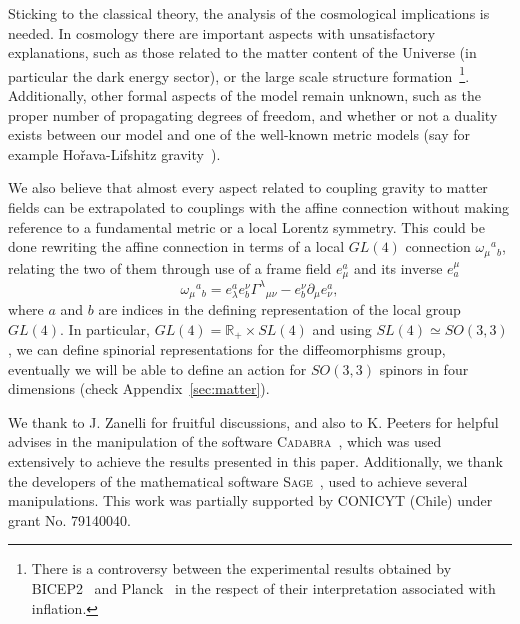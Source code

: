 \documentclass[twocolumn,aps,
  showpacs,showkeys,prd,superscriptaddress]{revtex4-1}
\renewcommand{\(}{\left(}
\renewcommand{\)}{\right)}
\renewcommand{\[}{\left[}
\renewcommand{\]}{\right]}
\begin{document}
Sticking to the classical theory, the analysis of the cosmological implications is needed. In cosmology there are important aspects with unsatisfactory explanations, such as those related to the matter content of the Universe (in particular the dark energy sector), or the large scale structure formation~\footnote{There is a controversy between the experimental results obtained by BICEP2~\cite{Ade:2014xna} and Planck~\cite{Adam:2014bub} in the respect of their interpretation associated with inflation.}. Additionally, other formal aspects of the model remain unknown, such as the proper number of propagating degrees of freedom, and whether or not a duality exists between our model and one of the well-known metric models (say for example Ho\v{r}ava-Lifshitz gravity~\cite{Horava:2009uw,*Sotiriou:2010wn}).

We also believe that almost every aspect related to coupling gravity to matter fields can be extrapolated to couplings with the affine connection without making reference to a fundamental metric or a local Lorentz symmetry. This could be  done rewriting the affine connection in terms of a local $GL(4)$ connection
$\omega_{\mu}{}^a{}_b$, relating the two of them through use of a frame field $e_\mu^a$ and its inverse $e^\mu_a$
\begin{equation}
  \omega_{\mu}{}^a{}_b = e_\lambda^a e_b^\nu \Gamma^{\lambda}{}_{\mu\nu} -  e_b^\nu\partial_{\mu}e_\nu^a,
\end{equation} where $a$ and $b$ are indices in the defining representation of the local group $GL(4)$.
 In particular, \mbox{$GL(4) = \mathbb{R}_+ \times SL(4)$} and using \mbox{$SL(4) \simeq SO(3,3)$,} we can define spinorial representations for the diffeomorphisms group, eventually we will be able to define an action for $SO(3,3)$ spinors in four dimensions (check Appendix~\ref{sec:matter}).


\begin{acknowledgments}
  We thank to J. Zanelli for fruitful discussions, and also to K. Peeters for helpful advises in the manipulation of the software \textsc{Cadabra}~\cite{Peeters:2007wn,*peeters2007symbolic,*Peeters2007550}, which was used extensively to achieve the results presented in this paper. Additionally, we thank the developers of the mathematical software \textsc{Sage}~\cite{sage}, used to achieve several manipulations. This work was partially supported by CONICYT (Chile) under grant No. 79140040.
\end{acknowledgments}


\appendix
\end{document}
